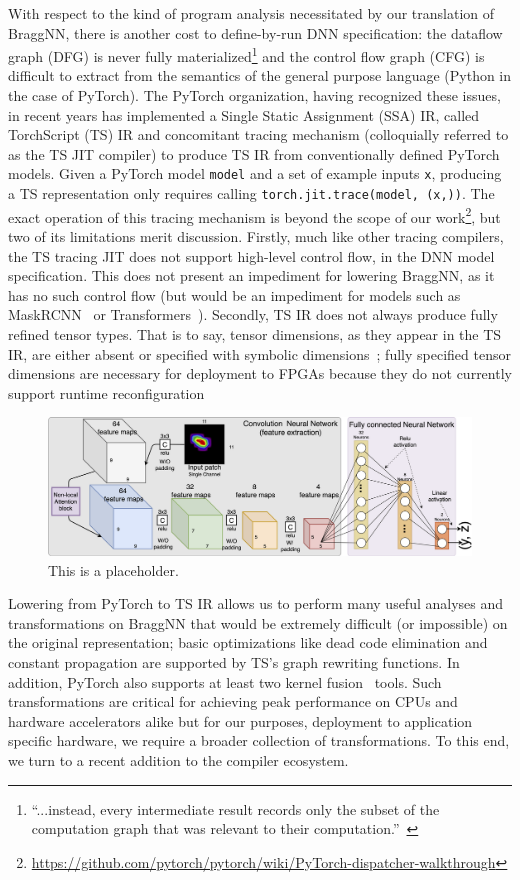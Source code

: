With respect to the kind of program analysis necessitated by our translation of BraggNN, there is another cost to define-by-run DNN specification: the dataflow graph (DFG) is never fully materialized\footnote{``...instead, every intermediate result records only the subset of the computation graph that was relevant to their computation.''~\cite{paszke2017automatic}} and the control flow graph (CFG) is difficult to extract from the semantics of the general purpose language (Python in the case of PyTorch).
The PyTorch organization, having recognized these issues, in recent years has implemented a Single Static Assignment (SSA) IR, called TorchScript (TS) IR and concomitant tracing mechanism (colloquially referred to as the TS JIT compiler) to produce TS IR from conventionally defined PyTorch models.
Given a PyTorch model \texttt{model} and a set of example inputs \texttt{x}, producing a TS representation only requires calling \texttt{torch.jit.trace(model, (x,))}.
The exact operation of this tracing mechanism is beyond the scope of our work\footnote{\url{https://github.com/pytorch/pytorch/wiki/PyTorch-dispatcher-walkthrough}}, but two of its limitations merit discussion.
Firstly, much like other tracing compilers, the TS tracing JIT does not support high-level control flow, in the DNN model specification.
This does not present an impediment for lowering BraggNN, as it has no such control flow (but would be an impediment for models such as MaskRCNN~\cite{8237584} or Transformers~\cite{radford2019language}).
Secondly, TS IR does not always produce fully refined tensor types.
That is to say, tensor dimensions, as they appear in the TS IR, are either absent or specified with symbolic dimensions~\cite{10.1145/3211346.3211348}; fully specified tensor dimensions are necessary for deployment to FPGAs because they do not currently support runtime reconfiguration~\cite{reconfigfpga}

\begin{figure}
	\includegraphics[width=\textwidth]{figures/BraggNN}
	\caption{This is a placeholder.}
\end{figure}
Lowering from PyTorch to TS IR allows us to perform many useful analyses and transformations on BraggNN that would be extremely difficult (or impossible) on the original representation;
basic optimizations like dead code elimination and constant propagation are supported by TS's graph rewriting functions.
In addition, PyTorch also supports at least two kernel fusion~\cite{10.1145/2688500.2688521} tools.
Such transformations are critical for achieving peak performance on CPUs and hardware accelerators alike but for our purposes, deployment to application specific hardware, we require a broader collection of transformations.
To this end, we turn to a recent addition to the compiler ecosystem.

